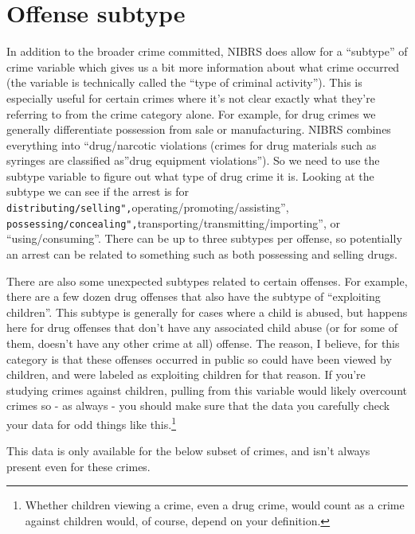 \documentclass[
]{krantz}
\begin{document}
\section{Offense subtype}\label{offense-subtype}

In addition to the broader crime committed, NIBRS does allow
for a ``subtype'' of crime variable which gives us a bit
more information about what crime occurred (the variable is
technically called the ``type of criminal activity''). This
is especially useful for certain crimes where it's not clear
exactly what they're referring to from the crime category
alone. For example, for drug crimes we generally
differentiate possession from sale or manufacturing. NIBRS
combines everything into ``drug/narcotic violations (crimes
for drug materials such as syringes are classified as''drug
equipment violations''). So we need to use the subtype
variable to figure out what type of drug crime it is.
Looking at the subtype we can see if the arrest is for
\texttt{distributing/selling",}operating/promoting/assisting'',
\texttt{possessing/concealing",}transporting/transmitting/importing'',
or ``using/consuming''. There can be up to three subtypes
per offense, so potentially an arrest can be related to
something such as both possessing and selling drugs.

There are also some unexpected subtypes related to certain
offenses. For example, there are a few dozen drug offenses
that also have the subtype of ``exploiting children''. This
subtype is generally for cases where a child is abused, but
happens here for drug offenses that don't have any
associated child abuse (or for some of them, doesn't have
any other crime at all) offense. The reason, I believe, for
this category is that these offenses occurred in public so
could have been viewed by children, and were labeled as
exploiting children for that reason. If you're studying
crimes against children, pulling from this variable would
likely overcount crimes so - as always - you should make
sure that the data you carefully check your data for odd
things like this.\footnote{Whether children viewing a crime,
  even a drug crime, would count as a crime against children
  would, of course, depend on your definition.}

This data is only available for the below subset of crimes,
and isn't always present even for these crimes.
\end{document}
